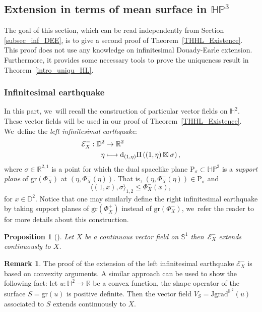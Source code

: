 \documentclass[JEP,XML,SOM,Unicode,NoEqCountersInSection, NoFloatCountersInSection,published]{cedram}
\newcommand\mto{\mathchoice{\longmapsto}{\mapsto}{\mapsto}{\mapsto}}
\theoremstyle{plain}
\newtheorem{prop}[cor]{Proposition}
\theoremstyle{definition}
\newtheorem{remark}[cor]{Remark}
\newcommand{\HP}{\mathbb{HP}^3}
\newcommand{\grad}{\mathrm{grad}^{\mathbb{H}^2}}
\newcommand{\J}{\mathrm{J}}
\newcommand{\inner}[1] {\langle #1 \rangle}
\begin{document}
\subsection{Extension in terms of mean surface in \texorpdfstring{$\HP$}{HP}}\label{section_5.2_extension_mean_surface}
The goal of this section, which can be read independently from Section \ref{subsec_inf_DEE}, is to give a second proof of Theorem~\ref{THHL_Existence}. This proof does not use any knowledge on infinitesimal Douady-Earle extension. Furthermore, it provides some necessary tools to prove the uniqueness result in Theorem~\ref{intro_uniqu_HL}.

\subsubsection{Infinitesimal earthquake}\label{appendix6.1}
In this part, we~will recall the construction of particular vector fields on $\mathbb{H}^2$. These vector fields will be used in our proof of Theorem~\ref{THHL_Existence}. We~define the \emph{left infinitesimal earthquake}:
\begin{equation}\label{infearth_convexhull}
\begin{aligned}
\mathcal{E}_{X}^-: \mathbb{D}^2 & \to \mathbb{R}^2 \\
\eta & \mto \mathrm{d}_{(1,\eta)}\Pi\left((1,\eta)\boxtimes \sigma\right),
\end{aligned}
\end{equation}
where $\sigma \in \mathbb{R}^{2,1}$ is a point for which the dual spacelike plane $\mathrm{P}_{\sigma}\subset\HP$ is a \emph{support plane} of $\mathrm{gr}(\Phi_X^-)$ at $(\eta, \Phi_X^-(\eta))$. That is, $(\eta, \Phi_X^-(\eta)) \in \mathrm{P}_{\sigma}$ and
\[
\inner{(1,x),\sigma}_{1,2}\leq\Phi_X^-(x),
\]
for $x\in\mathbb{D}^2$. Notice that one may similarly define the right infinitesimal earthquake by taking support planes of $\mathrm{gr}(\Phi_X^+)$ instead of $\mathrm{gr}(\Phi_X^-)$, we~refer the reader to \cite{diaf2023Infearth} for more details about this construction.

\begin{prop}[{\cite[Prop.\,4.6]{diaf2023Infearth}}]\label{infinitesimal_earthquake_thm}
Let $X$ be a continuous vector field on $\mathbb{S}^1$ then~$\mathcal{E}_X^{-}$ extends continuously to $X$.
\end{prop}

\begin{remark}
The proof of the extension of the left infinitesimal earthquake $\mathcal{E}_X^-$ is based on convexity arguments. A similar approach can be used to show the following fact: let $u:\mathbb{H}^2\to\mathbb{R}$ be a convex function, \ie the shape operator of the surface $S=\mathrm{gr}(u)$ is positive definite. Then the vector field $V_S=\J\grad(u)$ associated to $S$ extends continuously to $X$.
\end{remark}
\end{document}
